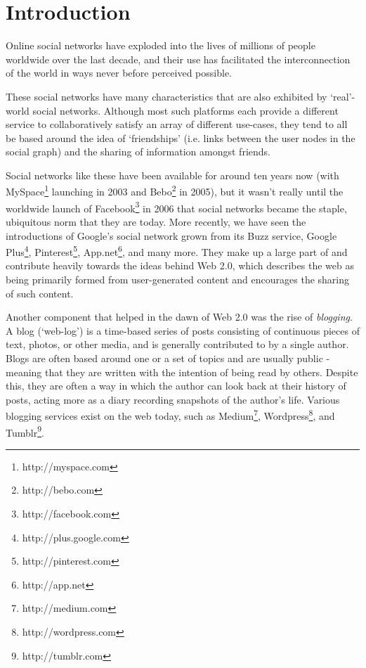 \chapter{Introduction}

Online social networks have exploded into the lives of millions of people worldwide over the last decade, and their use has facilitated the interconnection of the world in ways never before perceived possible.

These social networks have many characteristics that are also exhibited by `real'-world social networks. Although most such platforms each provide a different service to collaboratively satisfy an array of different use-cases, they tend to all be based around the idea of `friendships' (i.e. links between the user nodes in the social graph) and the sharing of information amongst friends.

Social networks like these have been available for around ten years now (with MySpace\footnote{http://myspace.com} launching in 2003 and Bebo\footnote{http://bebo.com} in 2005), but it wasn't really until the worldwide launch of Facebook\footnote{http://facebook.com} in 2006 that social networks became the staple, ubiquitous norm that they are today. More recently, we have seen the introductions of Google's social network grown from its Buzz service, Google Plus\footnote{http://plus.google.com}, Pinterest\footnote{http://pinterest.com}, App.net\footnote{http://app.net}, and many more. They make up a large part of and contribute heavily towards the ideas behind Web 2.0, which describes the web as being primarily formed from user-generated content and encourages the sharing of such content.

Another component that helped in the dawn of Web 2.0 was the rise of \textit{blogging}. A blog (`web-log') is a time-based series of posts consisting of continuous pieces of text, photos, or other media, and is generally contributed to by a single author. Blogs are often based around one or a set of topics and are usually public - meaning that they are written with the intention of being read by others. Despite this, they are often a way in which the author can look back at their history of posts, acting more as a diary recording snapshots of the author's life. Various blogging services exist on the web today, such as Medium\footnote{http://medium.com}, Wordpress\footnote{http://wordpress.com}, and Tumblr\footnote{http://tumblr.com}.


